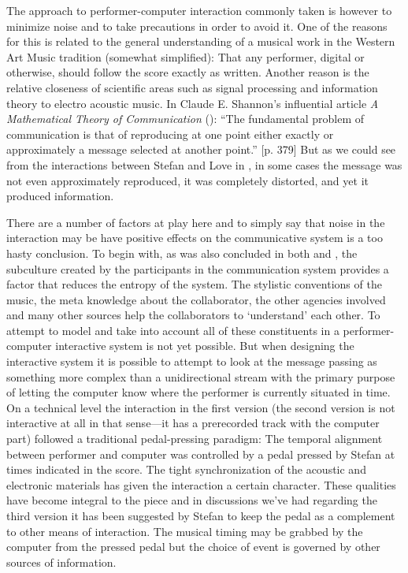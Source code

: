 The approach to performer-computer interaction commonly taken is
however to minimize noise and to take precautions in order to avoid
it. One of the reasons for this is related to the general
understanding of a musical work in the Western Art Music tradition
(somewhat simplified): That any performer, digital or otherwise,
should follow the score exactly as written. Another reason is the
relative closeness of scientific areas such as signal processing and
information theory to electro acoustic music. In Claude E. Shannon's
influential article \emph{A Mathematical Theory of Communication}
(\citeyear{shannon48}): ``The fundamental problem of communication is
that of reproducing at one point either exactly or approximately a
message selected at another point.'' [p. 379] But as we could see from the
interactions between Stefan and Love in \citet{frisk-ost06}, in some
cases the message was not even approximately reproduced, it was
completely distorted, and yet it produced information.

There are a number of factors at play here and to simply say that
noise in the interaction may be have positive effects on the
communicative system is a too hasty conclusion. To begin with, as was
also concluded in both \citet{frisk-ost06} and \citet{frisk-ost06-2},
the subculture created by the participants in the communication system
provides a factor that reduces the entropy of the system. The
stylistic conventions of the music, the meta knowledge about the
collaborator, the other agencies involved and many other sources help
the collaborators to `understand' each other. To attempt to model and
take into account all of these constituents in a performer-computer
interactive system is not yet possible. But when designing the
interactive system it is possible to attempt to look at the message
passing as something more complex than a unidirectional stream with
the primary purpose of letting the computer know where the performer
is currently situated in time. On a technical level the interaction in
the first version (the second version is not interactive at all in
that sense---it has a prerecorded track with the computer part)
followed a traditional pedal-pressing paradigm: The temporal alignment
between performer and computer was controlled by a pedal pressed by
Stefan at times indicated in the score. The tight synchronization of
the acoustic and electronic materials has given the interaction a
certain character. These qualities have become integral to the piece
and in discussions we've had regarding the third version it has been
suggested by Stefan to keep the pedal as a complement to other means
of interaction. The musical timing may be grabbed by the computer from
the pressed pedal but the choice of event is governed by other sources
of information.

